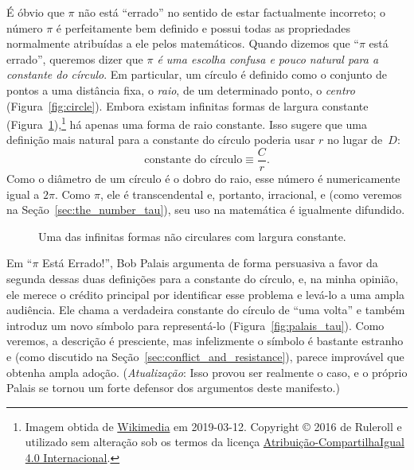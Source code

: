 É óbvio que $\pi$ não está ``errado'' no sentido de estar factualmente incorreto; o número $\pi$ é perfeitamente bem definido e possui todas as propriedades normalmente atribuídas a ele pelos matemáticos. Quando dizemos que ``$\pi$ está errado'', queremos dizer que \emph{$\pi$ é uma escolha confusa e pouco natural para a constante do círculo}. Em particular, um círculo é definido como o conjunto de pontos a uma distância fixa, o \emph{raio}, de um determinado ponto, o \emph{centro} (Figura~\ref{fig:circle}). Embora existam infinitas formas de largura constante (Figura~\ref{fig:constant_width}),\footnote{Imagem obtida de \href{https://commons.wikimedia.org/wiki/File:Reuleaux_triangle_roll.gif}{Wikimedia} em 2019-03-12. Copyright © 2016 de Ruleroll e utilizado sem alteração sob os termos da licença \href{https://creativecommons.org/licenses/by-sa/4.0/deed.pt_BR}{Atribuição-CompartilhaIgual 4.0 Internacional}.} há apenas uma forma de raio constante. Isso sugere que uma definição mais natural para a constante do círculo poderia usar $r$ no lugar de~$D$:
\begin{equation}
\label{eq:circle_constant}
\mbox{constante do círculo} \equiv \frac{C}{r}.
\end{equation}
Como o diâmetro de um círculo é o dobro do raio, esse número é numericamente igual a $2\pi$. Como $\pi$, ele é transcendental e, portanto, irracional, e (como veremos na Seção~\ref{sec:the_number_tau}), seu uso na matemática é igualmente difundido.

\begin{figure}
\caption{Uma das infinitas formas não circulares com largura constante.\label{fig:constant_width}}
\end{figure}

Em ``$\pi$ Está Errado!'', Bob Palais argumenta de forma persuasiva a favor da segunda dessas duas definições para a constante do círculo, e, na minha opinião, ele merece o crédito principal por identificar esse problema e levá-lo a uma ampla audiência. Ele chama a verdadeira constante do círculo de ``uma volta'' e também introduz um novo símbolo para representá-lo (Figura~\ref{fig:palais_tau}). Como veremos, a descrição é presciente, mas infelizmente o símbolo é bastante estranho e (como discutido na Seção~\ref{sec:conflict_and_resistance}), parece improvável que obtenha ampla adoção. (\emph{Atualização}: Isso provou ser realmente o caso, e o próprio Palais se tornou um forte defensor dos argumentos deste manifesto.)

